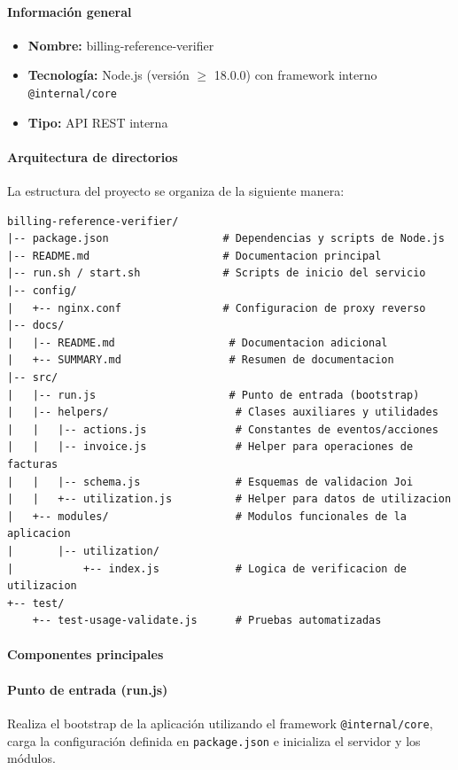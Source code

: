 \paragraph{Información general}
\begin{itemize}
    \item \textbf{Nombre:} billing-reference-verifier
    \item \textbf{Tecnología:} Node.js (versión $\geq$ 18.0.0) con framework interno \texttt{@internal/core}
    \item \textbf{Tipo:} API REST interna
\end{itemize}

\paragraph{Arquitectura de directorios}
La estructura del proyecto se organiza de la siguiente manera:

\begin{verbatim}
billing-reference-verifier/
|-- package.json                  # Dependencias y scripts de Node.js
|-- README.md                     # Documentacion principal
|-- run.sh / start.sh             # Scripts de inicio del servicio
|-- config/
|   +-- nginx.conf                # Configuracion de proxy reverso
|-- docs/
|   |-- README.md                  # Documentacion adicional
|   +-- SUMMARY.md                 # Resumen de documentacion
|-- src/
|   |-- run.js                     # Punto de entrada (bootstrap)
|   |-- helpers/                    # Clases auxiliares y utilidades
|   |   |-- actions.js              # Constantes de eventos/acciones
|   |   |-- invoice.js              # Helper para operaciones de facturas
|   |   |-- schema.js               # Esquemas de validacion Joi
|   |   +-- utilization.js          # Helper para datos de utilizacion
|   +-- modules/                    # Modulos funcionales de la aplicacion
|       |-- utilization/
|           +-- index.js            # Logica de verificacion de utilizacion
+-- test/
    +-- test-usage-validate.js      # Pruebas automatizadas
\end{verbatim}

\paragraph{Componentes principales}

\paragraph{Punto de entrada (run.js)}
Realiza el bootstrap de la aplicación utilizando el framework \texttt{@internal/core}, carga la
configuración definida en \texttt{package.json} e inicializa el servidor y los módulos.

